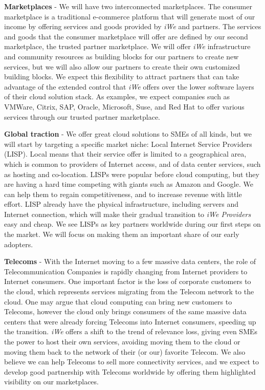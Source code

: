 \textbf{Marketplaces} - We will have two interconnected marketplaces. The
consumer marketplace is a traditional e-commerce platform that will generate
most of our income by offering services and goods provided by \textit{iWe}
and partners. The services and goods that the consumer marketplace will offer
are defined by our second marketplace, the trusted partner marketplace. We will
offer \textit{iWe} infrastructure and community resources as building blocks
for our partners to create new services, but we will also allow our partners to
create their own customized building blocks. We expect this flexibility to
attract partners that can take advantage of the extended control that
\textit{iWe} offers over the lower software layers of their cloud solution
stack.  As examples, we expect companies such as VMWare, Citrix, SAP, Oracle,
Microsoft, Suse, and Red Hat to offer various services through our trusted
partner marketplace.

\textbf{Global traction} - We offer great cloud solutions to SMEs of all kinds,
but we will start by targeting a specific market niche: Local Internet Service
Providers (LISP). Local means that their service offer is limited to a
geographical area, which is common to providers of Internet access, and of data
center services, such as hosting and co-location. LISPs were popular before cloud
computing, but they are having a hard time competing with giants such as Amazon
and Google. We can help them to regain competitiveness, and to increase revenue
with little effort.  LISP already have the physical infrastructure, including
servers and Internet connection, which will make their gradual transition to
\textit{iWe Providers} easy and cheap. We see LISPs as key partners worldwide
during our first steps on the market.  We will focus on making them an important
share of our early adopters.

\textbf{Telecoms} - With the Internet moving to a few massive data centers, the
role of Telecommunication Companies is rapidly changing from Internet providers
to Internet consumers. One important factor is the loss of corporate customers
to the cloud, which represents services migrating from the Telecom network to
the cloud. One may argue that cloud computing can bring new customers to
Telecoms, however the cloud only brings consumers of the same massive data
centers that were already forcing Telecoms into Internet consumers, speeding up
the transition.  \textit{iWe} offers a shift to the trend of relevance loss,
giving even SMEs the power to host their own services, avoiding moving them to
the cloud or moving them back to the network of their (or our) favorite Telecom.
We also believe we can help Telecoms to sell more connectivity services, and we
expect to develop good partnership with Telecoms worldwide by offering them
highlighted visibility on our marketplaces.

